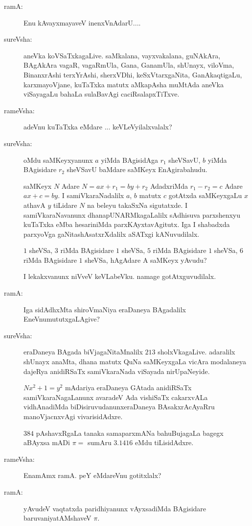 \begin{description}
\item[ramA:] Enu kAvayxmayaveV inenxVnAdarU....

\item[sureVsha:] aneVka koVSaTxkagaLive. saMkalana, vayxvakalana, guNAkAra, BAgAkAra vagaR, vagaRmUla, Gana, GanamUla, shUnayx, viloVma, BinanxrAshi terxYrAshi, sherxVDhi, keSxVtarxgaNita, GanAkaqtigaLu, karxmayoVjane, kuTaTxka matutx aMkapAsha muMtAda aneVka viSayagaLu bahaLa sulaBavAgi caciRsalapxTiTxve.

\item[rameVsha:] adeVnu kuTaTxka eMdare ... keVLeVyilalxvalalx?

\item[sureVsha:] oMdu saMKeyxyanunx $a$ yiMda BAgisidAga $r_{1}$ sheVSavU, $b$ yiMda BAgisidare $r_{2}$ sheVSavU baMdare saMKeyx EnAgirabahudu.

saMKeyx $N$ Adare $N=ax+r_{1}=by+r_{2}$ AdadxriMda $r_{1}-r_{2}=c$ Adare $ax+c=by$. I samiVkaraNadalilx $a$, $b$ matutx $c$ gotAtxda saMKeyxgaLu $x$ athavA $y$ tiLidare $N$ na beleyu takaSxNa sigutatxde. I samiVkaraNavanunx dhanapUNARMkagaLalilx sAdhisuva parxshenxyu kuTaTxka eMba hesariniMda parxKAyxtavAgitutx. Iga I shabadxda parxyoVga gaNitashAsatxrXdalilx aSATxgi kANuvudilalx.

$1$ sheVSa, $3$ riMda BAgisidare $1$ sheVSa, $5$ riMda BAgisidare $1$ sheVSa, $6$ riMda BAgisidare $1$ sheVSa, hAgAdare A saMKeyx yAvudu?

I lekakxvanunx niVveV keVLabeVku. namage gotAtxguvudilalx.

\item[ramA:] Iga sidAdhxMta shiroVmaNiya eraDaneya BAgadalilx EneVnu\break mututxgaLAgive?

\item[sureVsha:] eraDaneya BAgada biVjagaNitaMnalilx $213$ sholxVkagaLive. adaralilx shUnayx anaMta, dhana matutx QuNa saMKeyxgaLa vicAra modalaneya dajeRya anidiRSaTx samiVkaraNada viSayada nirUpaNeyide.

$Nx^{2}+1=y^{2}$ mAdariya eraDaneya GAtada anidiRSaTx samiVkaraNa\-gaLanunx avaradeV Ada vishiSaTx cakarxvALa vidhAnadiMda biDisiruvudanunx\break eraDaneya BAsakxrAcAyaRru manoVjacnxvAgi vivarisidAdxre.

$384$ pAshavxRgaLa tanaka samaparxmANa bahuBujagaLa bagegx aBAyxsa mADi $\pi=$ sumAru $3.1416$ eMdu tiLisidAdxre.

\item[rameVsha:] EnamAmx ramA. peY eMdareVnu gotitxlalx?

\item[ramA:] yAvudeV vaqtatxda paridhiyanunx vAyxsadiMda BAgisidare baruva\break niyatAMshaveV $\pi$.


\end{description}
